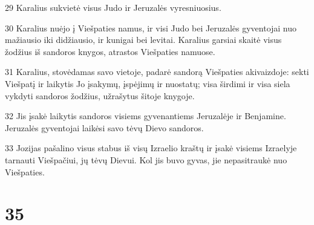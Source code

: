 \par 29 Karalius sukvietė visus Judo ir Jeruzalės vyresniuosius. 
\par 30 Karalius nuėjo į Viešpaties namus, ir visi Judo bei Jeruzalės gyventojai nuo mažiausio iki didžiausio, ir kunigai bei levitai. Karalius garsiai skaitė visus žodžius iš sandoros knygos, atrastos Viešpaties namuose. 
\par 31 Karalius, stovėdamas savo vietoje, padarė sandorą Viešpaties akivaizdoje: sekti Viešpatį ir laikytis Jo įsakymų, įspėjimų ir nuostatų; visa širdimi ir visa siela vykdyti sandoros žodžius, užrašytus šitoje knygoje. 
\par 32 Jis įsakė laikytis sandoros visiems gyvenantiems Jeruzalėje ir Benjamine. Jeruzalės gyventojai laikėsi savo tėvų Dievo sandoros. 
\par 33 Jozijas pašalino visus stabus iš visų Izraelio kraštų ir įsakė visiems Izraelyje tarnauti Viešpačiui, jų tėvų Dievui. Kol jis buvo gyvas, jie nepasitraukė nuo Viešpaties.



\chapter{35}


